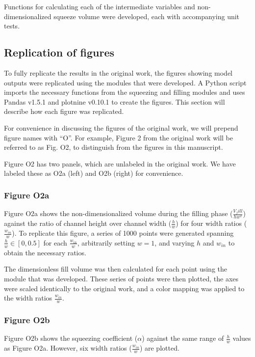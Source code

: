 Functions for calculating each of the intermediate variables and non-dimensionalized squeeze volume
were developed, each with accompanying unit tests.

\subsection{Replication of figures}

To fully replicate the results in the original work, the figures showing model outputs were
replicated using the modules that were developed. A Python script imports the necessary
functions from the squeezing and filling modules and uses Pandas v1.5.1\supercite{team_pandas_2020}
and plotnine v0.10.1\supercite{kibirige_plotnine_2022} to create the figures.
This section will describe how each figure was replicated.

For convenience in discussing the figures of the original work, we will prepend figure names
with “O”. For example, Figure 2 from the original work will be referred to as Fig. O2,
to distinguish from the figures in this manuscript.

Figure O2 has two panels, which are unlabeled in the original work. We have labeled these as O2a
(left) and O2b (right) for convenience.

\subsubsection{Figure O2a}

Figure O2a shows the non-dimensionalized volume during the filling phase ($\frac{V_fill}{hw^2}$)
against the ratio of channel height over channel width ($\frac{h}{w}$) for four width ratios 
($\frac{w_{in}}{w}$).
To replicate this figure, a series of 1000 points were generated spanning $\frac{h}{w} \in [0,0.5]$
for each $\frac{w_{in}}{w}$, arbitrarily setting $w=1$, and varying $h$ and
$w_{in}$ to obtain the necessary ratios.

The dimensionless fill volume was then calculated for each point using the module that was
developed. These series of points were then plotted, the axes were scaled identically to the
original work, and a color mapping was applied to the width ratios $\frac{w_{in}}{w}$.

\subsubsection{Figure O2b}

Figure O2b shows the squeezing coefficient ($\alpha$) against the same range of $\frac{h}{w}$
values as Figure O2a. However, six width ratios ($\frac{w_{in}}{w}$) are plotted.

